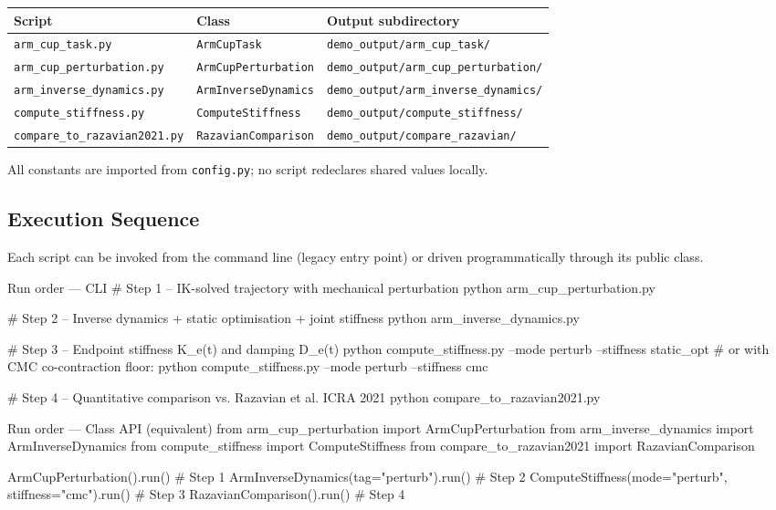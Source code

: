 \documentclass[11pt,a4paper]{article}
\newcommand{\py}[1]{\texttt{\color{PipeBlue}#1}}
\newcommand{\file}[1]{\texttt{\color{PipePurple}#1}}
\newcommand{\outdir}[1]{\texttt{\small\color{PipeGreen}#1}}
\begin{document}
\begin{tabular}{lll}
\toprule
\textbf{Script} & \textbf{Class} & \textbf{Output subdirectory} \\
\midrule
\rowcolor{LightBlue}   \file{arm\_cup\_task.py}          & \py{ArmCupTask}           & \outdir{demo\_output/arm\_cup\_task/} \\
\rowcolor{LightOrange} \file{arm\_cup\_perturbation.py}  & \py{ArmCupPerturbation}   & \outdir{demo\_output/arm\_cup\_perturbation/} \\
\rowcolor{LightPurple} \file{arm\_inverse\_dynamics.py}  & \py{ArmInverseDynamics}   & \outdir{demo\_output/arm\_inverse\_dynamics/} \\
\rowcolor{LightRed}    \file{compute\_stiffness.py}      & \py{ComputeStiffness}     & \outdir{demo\_output/compute\_stiffness/} \\
\rowcolor{LightGreen}  \file{compare\_to\_razavian2021.py}& \py{RazavianComparison}   & \outdir{demo\_output/compare\_razavian/} \\
\bottomrule
\end{tabular}

\medskip
All constants are imported from \file{config.py}; no script redeclares
shared values locally.

\subsection{Execution Sequence}

Each script can be invoked from the command line (legacy entry point) or
driven programmatically through its public class.

\begin{codebox}{Run order — CLI}
# Step 1 -- IK-solved trajectory with mechanical perturbation
python arm_cup_perturbation.py

# Step 2 -- Inverse dynamics + static optimisation + joint stiffness
python arm_inverse_dynamics.py

# Step 3 -- Endpoint stiffness K_e(t) and damping D_e(t)
python compute_stiffness.py --mode perturb --stiffness static_opt
# or with CMC co-contraction floor:
python compute_stiffness.py --mode perturb --stiffness cmc

# Step 4 -- Quantitative comparison vs. Razavian et al. ICRA 2021
python compare_to_razavian2021.py
\end{codebox}

\begin{codebox}{Run order — Class API (equivalent)}
from arm_cup_perturbation    import ArmCupPerturbation
from arm_inverse_dynamics    import ArmInverseDynamics
from compute_stiffness       import ComputeStiffness
from compare_to_razavian2021 import RazavianComparison

ArmCupPerturbation().run()                                       # Step 1
ArmInverseDynamics(tag="perturb").run()                          # Step 2
ComputeStiffness(mode="perturb", stiffness="cmc").run()          # Step 3
RazavianComparison().run()                                       # Step 4
\end{codebox}
\end{document}
